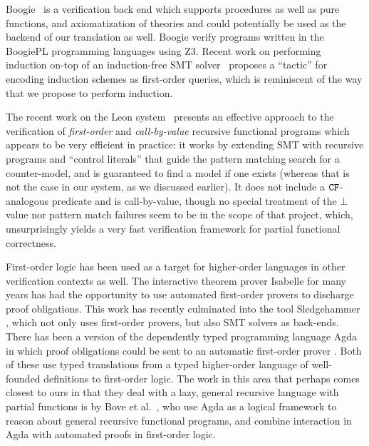 Boogie~\cite{boogie} is a verification back end which supports procedures as well as 
pure functions, and axiomatization of theories and could potentially be used as the 
backend of our translation as well. Boogie verify programs written in the BoogiePL 
programming languages using Z3. Recent work on performing induction on-top of an 
induction-free SMT solver~\cite{Leino:2012:AIS:2189257.2189278} proposes a ``tactic''
for encoding induction schemes as first-order queries, which is reminiscent of the way
that we propose to perform induction.

The recent work on the Leon system~\cite{Suter:2011:SMR:2041552.2041575} presents
an effective approach to the verification of {\em first-order} and {\em call-by-value} 
recursive functional programs which appears to be very efficient in practice: it works
by extending SMT with recursive programs and ``control literals'' that guide the pattern
matching search for a counter-model, and is guaranteed to find a model if one exists 
(whereas that is not the case in our system, as we discussed earlier). It does not include
a ${\tt CF}$-analogous predicate and is call-by-value, though no special treatment of the $\bot$ 
value nor pattern match failures seem to be in the scope of that project, which, unsurprisingly
yields a very fast verification framework for partial functional correctness. 

First-order logic has been used as a target for higher-order languages in other verification contexts as well.
The interactive theorem prover Isabelle for many years has had the opportunity to use
automated first-order provers to discharge proof obligations. This work has recently culminated into the tool
Sledgehammer \cite{Sledgehammer}, which not only uses first-order provers, but also SMT solvers as back-ends.
There has been a version of the dependently typed programming language Agda in which
proof obligations could be sent to an automatic first-order prover \cite{AgdaFOL}. Both of these use typed translations from a typed higher-order language of well-founded definitions to first-order logic. The work in this area that perhaps comes closest to ours in that they deal with a lazy, general recursive language with partial functions is by Bove et al.\ \cite{TypeTheoryFOL}, who use Agda as a logical framework to reason about general recursive functional programs, and combine interaction in Agda with automated proofs in first-order logic.

